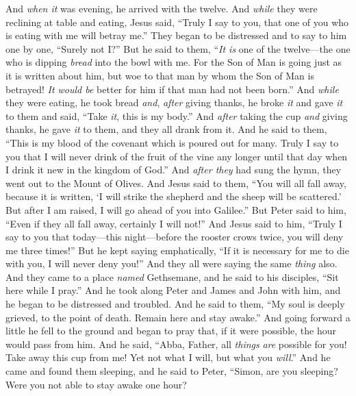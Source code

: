 \begin{biblechapter}
\verse And \textit{when it} was evening, he arrived with the twelve.
\verse And \textit{while} they were reclining at table and eating, Jesus said, “Truly I say to you, that one of you who is eating with me will betray me.”
\verse They began to be distressed and to say to him one by one, “Surely not I?”
\verse But he said to them, “\textit{It is} one of the twelve—the one who is dipping \textit{bread} into the bowl with me.
\verse For the Son of Man is going just as it is written about him, but woe to that man by whom the Son of Man is betrayed! \textit{It would be} better for him if that man had not been born.”
 And \textit{while} they were eating, he took bread \textit{and}, \textit{after} giving thanks, he broke \textit{it} and gave \textit{it} to them and said, “Take \textit{it}, this is my body.”
\verse And \textit{after} taking the cup \textit{and} giving thanks, he gave \textit{it} to them, and they all drank from it.
\verse And he said to them, “This is my blood of the covenant which is poured out for many.
\verse Truly I say to you that I will never drink of the fruit of the vine any longer until that day when I drink it new in the kingdom of God.”
\verse And \textit{after they} had sung the hymn, they went out to the Mount of Olives.
 And Jesus said to them, “You will all fall away, because it is written, ‘I will strike the shepherd 
and the sheep will be scattered.’
\verse But after I am raised, I will go ahead of you into Galilee.”
\verse But Peter said to him, “Even if they all fall away, certainly I will not!”
\verse And Jesus said to him, “Truly I say to you that today—this night—before the rooster crows twice, you will deny me three times!”
\verse But he kept saying emphatically, “If it is necessary for me to die with you, I will never deny you!” And they all were saying the same \textit{thing} also.
 And they came to a place \textit{named} Gethsemane, and he said to his disciples, “Sit here while I pray.”
\verse And he took along Peter and James and John with him, and he began to be distressed and troubled.
\verse And he said to them, “My soul is deeply grieved, to the point of death. Remain here and stay awake.”
\verse And going forward a little he fell to the ground and began to pray that, if it were possible, the hour would pass from him.
\verse And he said, “Abba, Father, all \textit{things} \textit{are} possible for you! Take away this cup from me! Yet not what I will, but what you \textit{will}.”
\verse And he came and found them sleeping, and he said to Peter, “Simon, are you sleeping? Were you not able to stay awake one hour?

\end{biblechapter}
